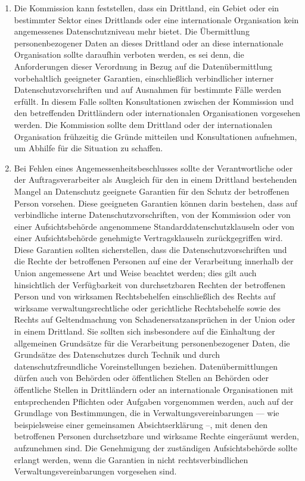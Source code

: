 \begin{enumerate}

   \item Die Kommission kann feststellen, dass ein Drittland, ein Gebiet oder ein bestimmter Sektor eines Drittlands
    oder eine internationale Organisation kein angemessenes Datenschutzniveau mehr bietet. Die Übermittlung
    personenbezogener Daten an dieses Drittland oder an diese internationale Organisation sollte daraufhin verboten
    werden, es sei denn, die Anforderungen dieser Verordnung in Bezug auf die Datenübermittlung vorbehaltlich
    geeigneter Garantien, einschließlich verbindlicher interner Datenschutzvorschriften und auf Ausnahmen für bestimmte
    Fälle werden erfüllt. In diesem Falle sollten Konsultationen zwischen der Kommission und den betreffenden
    Drittländern oder internationalen Organisationen vorgesehen werden. Die Kommission sollte dem Drittland oder der
    internationalen Organisation frühzeitig die Gründe mitteilen und Konsultationen aufnehmen, um Abhilfe für die
    Situation zu schaffen.%
   \label{eg:107}
   

   \item Bei Fehlen eines Angemessenheitsbeschlusses sollte der Verantwortliche oder der Auftragsverarbeiter als
    Ausgleich für den in einem Drittland bestehenden Mangel an Datenschutz geeignete Garantien für den Schutz der
    betroffenen Person vorsehen. Diese geeigneten Garantien können darin bestehen, dass auf verbindliche interne
    Datenschutzvorschriften, von der Kommission oder von einer Aufsichtsbehörde angenommene Standarddatenschutzklauseln
    oder von einer Aufsichtsbehörde genehmigte Vertragsklauseln zurückgegriffen wird. Diese Garantien sollten
    sicherstellen, dass die Datenschutzvorschriften und die Rechte der betroffenen Personen auf eine der Verarbeitung
    innerhalb der Union angemessene Art und Weise beachtet werden; dies gilt auch hinsichtlich der Verfügbarkeit von
    durchsetzbaren Rechten der betroffenen Person und von wirksamen Rechtsbehelfen einschließlich des Rechts auf
    wirksame verwaltungsrechtliche oder gerichtliche Rechtsbehelfe sowie des Rechts auf Geltendmachung von
    Schadenersatzansprüchen in der Union oder in einem Drittland. Sie sollten sich insbesondere auf die Einhaltung der
    allgemeinen Grundsätze für die Verarbeitung personenbezogener Daten, die Grundsätze des Datenschutzes durch Technik
    und durch datenschutzfreundliche Voreinstellungen beziehen. Datenübermittlungen dürfen auch von Behörden oder
    öffentlichen Stellen an Behörden oder öffentliche Stellen in Drittländern oder an internationale Organisationen mit
    entsprechenden Pflichten oder Aufgaben vorgenommen werden, auch auf der Grundlage von Bestimmungen, die in
    Verwaltungsvereinbarungen — wie beispielsweise einer gemeinsamen Absichtserklärung –, mit denen den betroffenen
    Personen durchsetzbare und wirksame Rechte eingeräumt werden, aufzunehmen sind. Die Genehmigung der zuständigen
    Aufsichtsbehörde sollte erlangt werden, wenn die Garantien in nicht rechtsverbindlichen Verwaltungsvereinbarungen
    vorgesehen sind.%
   \label{eg:108}
   

\end{enumerate}
